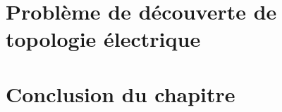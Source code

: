 \documentclass[onecolumn, 12pt]{book}
\begin{document}
	\section{Probl\`eme de d\'ecouverte de topologie \'electrique}
		
			
	\section{Conclusion du chapitre}
		
		
\end{document}
